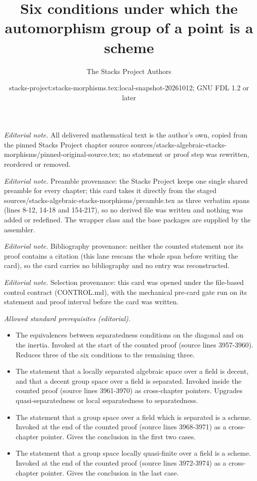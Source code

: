 \documentclass[10pt,a4paper]{amsart}
\title{Six conditions under which the automorphism group of a point is a scheme}
\author{The Stacks Project Authors}
\date{stacks-project:stacks-morphisms.tex:local-snapshot-20261012; GNU FDL 1.2 or later}
\theoremstyle{plain}
\theoremstyle{definition}
\theoremstyle{remark}
\numberwithin{equation}{subsection}
\begin{document}
\maketitle
\noindent\textit{Editorial note.} All delivered mathematical text is the author's own, copied from the pinned Stacks Project chapter source sources/stacks-algebraic-stacks-morphisms/pinned-original-source.tex; no statement or proof step was rewritten, reordered or removed.\par\medskip
\noindent\textit{Editorial note.} Preamble provenance: the Stacks Project keeps one single shared preamble for every chapter; this card takes it directly from the staged sources/stacks-algebraic-stacks-morphisms/preamble.tex as three verbatim spans (lines 8-12, 14-18 and 154-217), so no derived file was written and nothing was added or redefined. The wrapper class and the base packages are supplied by the assembler.\par\medskip
\noindent\textit{Editorial note.} Bibliography provenance: neither the counted statement nor its proof contains a citation (this lane rescans the whole span before writing the card), so the card carries no bibliography and no entry was reconstructed.\par\medskip
\noindent\textit{Editorial note.} Selection provenance: this card was opened under the file-based control contract (CONTROL.md), with the mechanical pre-card gate run on its statement and proof interval before the card was written.\par\medskip
\noindent\textit{Allowed standard prerequisites (editorial).}\begin{itemize}
\item The equivalences between separatedness conditions on the diagonal and on the inertia. Invoked at the start of the counted proof (source lines 3957-3960). Reduces three of the six conditions to the remaining three.
\item The statement that a locally separated algebraic space over a field is decent, and that a decent group space over a field is separated. Invoked inside the counted proof (source lines 3961-3970) as cross-chapter pointers. Upgrades quasi-separatedness or local separatedness to separatedness.
\item The statement that a group space over a field which is separated is a scheme. Invoked at the end of the counted proof (source lines 3968-3971) as a cross-chapter pointer. Gives the conclusion in the first two cases.
\item The statement that a group space locally quasi-finite over a field is a scheme. Invoked at the end of the counted proof (source lines 3972-3974) as a cross-chapter pointer. Gives the conclusion in the last case.
\end{itemize}\medskip
\end{document}

